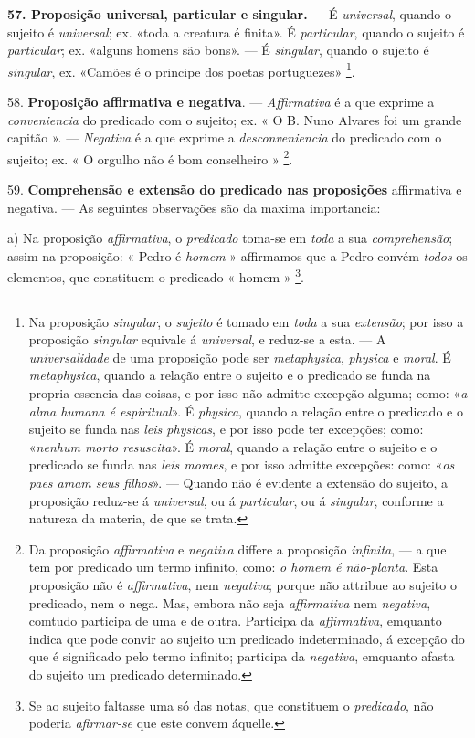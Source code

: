 \textbf{57. Proposição universal, particular e singular.} --- É \emph{universal}, quando o sujeito é \emph{universal}; ex. «toda a creatura é finita». É \emph{particular}, quando o sujeito é \emph{particular}; ex. «alguns homens são bons». --- É \emph{singular}, quando o sujeito é \emph{singular}, ex. «Camões é o principe dos poetas portuguezes» \footnote{Na proposição \emph{singular}, o \emph{sujeito} é tomado em \emph{toda} a sua \emph{extensão}; por isso a proposição \emph{singular} equivale á \emph{universal}, e reduz-se a esta. --- A \emph{universalidade} de uma proposição pode ser \emph{metaphysica}, \emph{physica} e \emph{moral}. É \emph{metaphysica}, quando a relação entre o sujeito e o predicado se funda na propria essencia das coisas, e por isso não admitte excepção alguma; como: «\emph{a alma humana é espiritual}». É \emph{physica}, quando a relação entre o predicado e o sujeito se funda nas \emph{leis physicas}, e por isso pode ter excepções; como: «\emph{nenhum morto resuscita}». É \emph{moral}, quando a relação entre o sujeito e o predicado se funda nas \emph{leis moraes}, e por isso admitte excepções: como: «\emph{os paes amam seus filhos}». --- Quando não é evidente a extensão do sujeito, a proposição reduz-se á \emph{universal}, ou á \emph{particular}, ou á \emph{singular}, conforme a natureza da materia, de que se trata.}.

58. \textbf{Proposição affirmativa e negativa}. --- \emph{Affirmativa} é a que exprime a \emph{conveniencia} do predicado com o sujeito; ex. « O B. Nuno Alvares foi um grande capitão ». --- \emph{Negativa} é a que exprime a \emph{desconveniencia} do predicado com o sujeito; ex. « O orgulho não é bom conselheiro » \footnote{Da proposição \emph{affirmativa} e \emph{negativa} differe a proposição \emph{infinita}, --- a que tem por predicado um termo infinito, como: \emph{o homem é não-planta}. Esta proposição não é \emph{affirmativa}, nem \emph{negativa}; porque não attribue ao sujeito o predicado, nem o nega. Mas, embora não seja \emph{affirmativa} nem \emph{negativa}, comtudo participa de uma e de outra. Participa da \emph{affirmativa}, emquanto indica que pode convir ao sujeito um predicado indeterminado, á excepção do que é significado pelo termo infinito; participa da \emph{negativa}, emquanto afasta do sujeito um predicado determinado.}.

59. \textbf{Comprehensão e extensão do predicado nas proposições} affirmativa e negativa. --- As seguintes observações são da maxima importancia:

a) Na proposição \emph{affirmativa}, o \emph{predicado} toma-se em \emph{toda} a sua \emph{comprehensão}; assim na proposição: « Pedro é \emph{homem} » affirmamos que a Pedro convém \emph{todos} os elementos, que constituem o predicado « homem » \footnote{Se ao sujeito faltasse uma só das notas, que constituem o \emph{predicado}, não poderia \emph{afirmar-se} que este convem áquelle.}.

